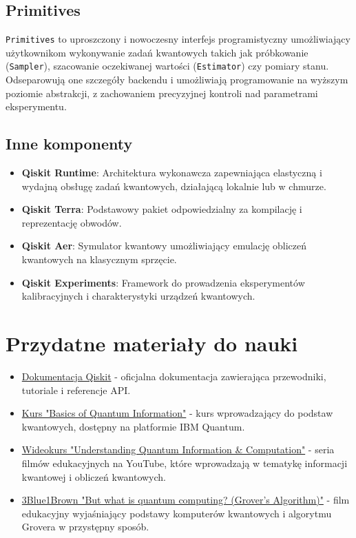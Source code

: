 \documentclass[a4paper,12pt]{article}
\begin{document}
\subsection{Primitives}
\texttt{Primitives} to uproszczony i nowoczesny interfejs programistyczny umożliwiający użytkownikom wykonywanie zadań kwantowych takich jak próbkowanie (\texttt{Sampler}), szacowanie oczekiwanej wartości (\texttt{Estimator}) czy pomiary stanu. Odseparowują one szczegóły backendu i umożliwiają programowanie na wyższym poziomie abstrakcji, z zachowaniem precyzyjnej kontroli nad parametrami eksperymentu.

\subsection{Inne komponenty}
\begin{itemize}
  \item \textbf{Qiskit Runtime}: Architektura wykonawcza zapewniająca elastyczną i wydajną obsługę zadań kwantowych, działającą lokalnie lub w chmurze.
  \item \textbf{Qiskit Terra}: Podstawowy pakiet odpowiedzialny za kompilację i reprezentację obwodów.
  \item \textbf{Qiskit Aer}: Symulator kwantowy umożliwiający emulację obliczeń kwantowych na klasycznym sprzęcie.
  \item \textbf{Qiskit Experiments}: Framework do prowadzenia eksperymentów kalibracyjnych i charakterystyki urządzeń kwantowych.
\end{itemize}

\section{Przydatne materiały do nauki}

\begin{itemize}
    \item \href{https://qiskit.org/documentation/}{Dokumentacja Qiskit} - oficjalna dokumentacja zawierająca przewodniki, tutoriale i referencje API.
    \item \href{https://learning.quantum.ibm.com/course/basics-of-quantum-information}{Kurs "Basics of Quantum Information"} - kurs wprowadzający do podstaw kwantowych, dostępny na platformie IBM Quantum.
    \item \href{https://www.youtube.com/playlist?list=PLOFEBzvs-VvqKKMXX4vbi4EB1uaErFMSO}{Wideokurs "Understanding Quantum Information \& Computation"} - seria filmów edukacyjnych na YouTube, które wprowadzają w tematykę informacji kwantowej i obliczeń kwantowych.
    \item \href{https://youtu.be/RQWpF2Gb-gU?feature=shared}{3Blue1Brown "But what is quantum computing? (Grover's Algorithm)"} - film edukacyjny wyjaśniający podstawy komputerów kwantowych i algorytmu Grovera w przystępny sposób.
\end{itemize}
\end{document}
